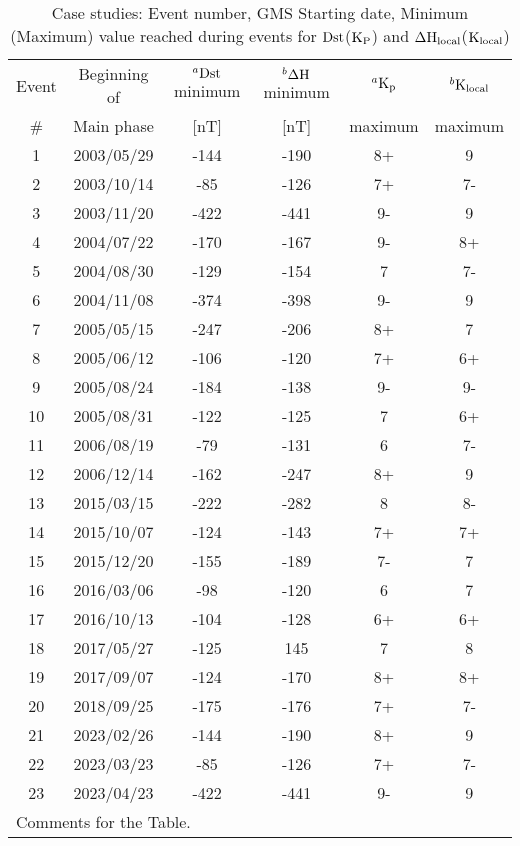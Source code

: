 \documentclass[12pt]{article}
\begin{document}
\begin{table*}[h!]
	\normalsize
	\centering
	\caption{Case studies: Event number, GMS Starting date, Minimum (Maximum) value reached during events for ${\rm Dst}$(${\rm K_P}$) and ${\rm \Delta H_{local}}$(${\rm K_{local}}$)}
	\label{tab:1}
	\begin{tabular}{cccccc}
		\hline
		Event & Beginning of & $^a {\rm Dst}$ minimum
		& $^b{\rm \Delta H}$ minimum
		& $^a{\rm K_p}$ & $^b {\rm K_{local}}$ \\
		\#    & Main phase & [nT] & [nT] & maximum & maximum\\
		\hline
		1 & 2003/05/29 & -144 & -190 & 8+ & 9 \\ 
		2 & 2003/10/14 & -85 & -126 & 7+ & 7- \\ 
		3 & 2003/11/20 & -422 & -441 & 9- & 9 \\ 
		4 & 2004/07/22 & -170 & -167 & 9- & 8+ \\ 
		5 & 2004/08/30 & -129 & -154 & 7 & 7- \\ 
		6 & 2004/11/08 & -374 & -398 & 9- & 9 \\ 
		7 & 2005/05/15 & -247 & -206 & 8+ & 7 \\ 
		8 & 2005/06/12 & -106 & -120 & 7+ & 6+ \\ 
		9 & 2005/08/24 & -184 & -138 & 9- & 9- \\ 
		10 & 2005/08/31 & -122 & -125 & 7 & 6+ \\ 
		11 & 2006/08/19 & -79 & -131 & 6 & 7- \\ 
		12 & 2006/12/14 & -162 & -247 & 8+ & 9 \\ 
		13 & 2015/03/15 & -222 & -282 & 8 & 8- \\ 
		14 & 2015/10/07 & -124 & -143 & 7+ & 7+ \\ 
		15 & 2015/12/20 & -155 & -189 & 7- & 7 \\ 
		16 & 2016/03/06 & -98 & -120 & 6 & 7 \\ 
		17 & 2016/10/13 & -104 & -128 & 6+ & 6+ \\ 
		18 & 2017/05/27 & -125 & 145 & 7 & 8 \\ 
		19 & 2017/09/07 & -124 & -170 & 8+ & 8+ \\ 
		20 & 2018/09/25 & -175 & -176 & 7+ & 7- \\
		21 & 2023/02/26 & -144 & -190 & 8+ & 9 \\ 
		22 & 2023/03/23 & -85 & -126 & 7+ & 7- \\ 
		23 & 2023/04/23 & -422 & -441 & 9- & 9 \\ 		 
		\hline
		\multicolumn{6}{l}{Comments for the Table.} \\

\end{tabular}
\end{table*}
\end{document}
